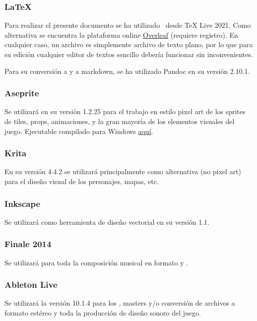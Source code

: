 \subsubsection{LaTeX}
Para realizar el presente documento se ha utilizado \LaTeXe\ desde TeX Live 2021. Como alternativa se encuentra la plataforma online \href{https://www.overleaf.com/}{Overleaf} (requiere registro). En cualquier caso, un archivo  es simplemente archivo de texto plano, por lo que para su edición cualquier editor de textos sencillo debería funcionar sin inconvenientes.

Para su conversión a  y a markdown, se ha utilizado Pandoc en su versión 2.10.1.

\subsubsection{Aseprite}
Se utilizará en su versión 1.2.25 para el trabajo en estilo pixel art de los sprites de tiles, props, animaciones,  y la gran mayoría de los elementos visuales del juego. Ejecutable compilado para Windows \href{https://drive.google.com/drive/folders/1DPhGeg7WzV9j81u3B5isgsXqoMtfd_Uv?usp=sharing}{aquí}.

\subsubsection{Krita}
En su versión 4.4.2 se utilizará principalmente como alternativa (no pixel art) para el diseño visual de los personajes, mapas, etc.

\subsubsection{Inkscape}
Se utilizará como herramienta de diseño vectorial en su versión 1.1.

\subsubsection{Finale 2014}
Se utilizará para toda la composición musical en formato  y .

\subsubsection{Ableton Live}
Se utilizará la versión 10.1.4 para los , masters y/o conversión de archivos  a formato  estéreo y toda la producción de diseño sonoro del juego.

